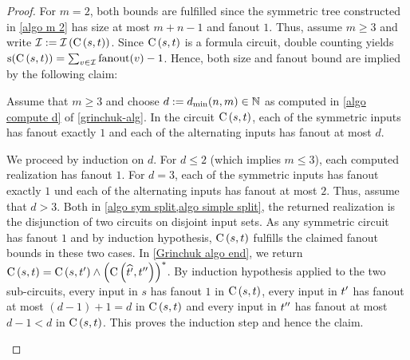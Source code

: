  \begin{proof}
  For $m = 2$, both bounds are fulfilled
  since the symmetric tree constructed in \cref{algo m 2}
  has size at most $m + n -1$ and fanout $1$.
  Thus, assume $m \geq 3$ and write $\cktins := \cktins\Bkt{\depthckt\Bkt{s, t}}$.
  Since $\depthckt\Bkt{s, t}$ is a formula circuit,
  double counting yields $\size(\depthckt\Bkt{s, t}) = \sum_{v \in \cktins} \fanout(v) - 1$.
  Hence, both size and fanout bound are implied by the following claim:
  \begin{claim_no_num}
   Assume that $m \geq 3$ and choose $d := \dmin(n, m) \in \N$ as computed in \cref{algo compute d} of \cref{grinchuk-alg}.
   In the circuit $\depthckt\Bkt{s, t}$,
   each of the symmetric inputs has fanout exactly $1$
   and each of the alternating inputs has fanout at most $d$.
   \begin{proof_of_claim}
    We proceed by induction on $d$.
    For $d \leq 2$ (which implies $m \leq 3$), each computed realization has fanout $1$.
    For $d = 3$, each of the symmetric inputs has fanout exactly $1$ und each of the
    alternating inputs has fanout at most $2$.
    Thus, assume that $d > 3$.
    Both in \cref{algo sym split,algo simple split},
    the returned realization is the disjunction of two circuits on disjoint input sets.
    As any symmetric circuit has fanout $1$
    and by induction hypothesis, $\depthckt\Bkt{s, t}$ fulfills the claimed fanout bounds
    in these two cases.
    In \cref{Grinchuk algo end}, we return
    $\depthckt\Bkt{s, t} = \depthckt\Bkt{s, \prefix{t}{k}} \land \Bkt{\depthckt\Bkt{\everysecond{\prefix{t}{k}}, \suffix{t}{k}}}^*$.
    By induction hypothesis applied to the two sub-circuits,
    every input in $s$ has fanout $1$ in $\depthckt\Bkt{s, t}$,
    every input in $\prefix{t}{k}$ has fanout at most $(d-1) + 1 = d$ in $\depthckt\Bkt{s, t}$
    and every input in $\suffix{t}{k}$ has fanout at most $d-1 < d$ in $\depthckt\Bkt{s, t}$.
    This proves the induction step and hence the claim.
   \end{proof_of_claim}
  \end{claim_no_num}
 \end{proof}


